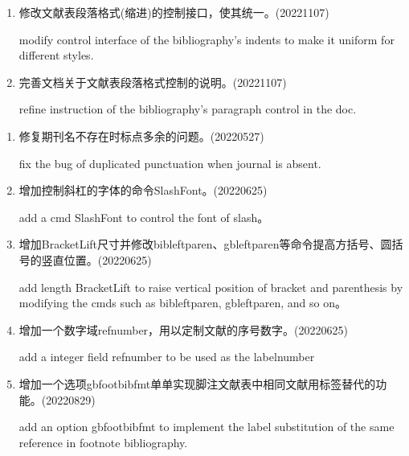 \label{up:20221107}
\begin{enumerate}


\item 修改文献表段落格式(缩进)的控制接口，使其统一。(20221107)

modify control interface of the bibliography's indents to make it uniform for different styles.

\item 完善文档关于文献表段落格式控制的说明。(20221107)

refine instruction of the bibliography's paragraph control in the doc.

\end{enumerate}


\label{up:20220829}
\begin{enumerate}

\item 修复期刊名不存在时标点多余的问题。(20220527)

fix the bug of duplicated punctuation when journal is absent.

\item 增加控制斜杠的字体的命令SlashFont。(20220625)

add a cmd SlashFont to control the font of slash。


\item 增加BracketLift尺寸并修改bibleftparen、gbleftparen等命令提高方括号、圆括号的竖直位置。(20220625)

add length BracketLift to raise vertical position of bracket and parenthesis by modifying the cmds such as bibleftparen, gbleftparen, and so on。


\item 增加一个数字域refnumber，用以定制文献的序号数字。(20220625)

add a integer field refnumber to be used as the labelnumber

\item 增加一个选项gbfootbibfmt单单实现脚注文献表中相同文献用标签替代的功能。(20220829)

add an option gbfootbibfmt to implement the label substitution of the same reference in footnote bibliography.

\end{enumerate}



